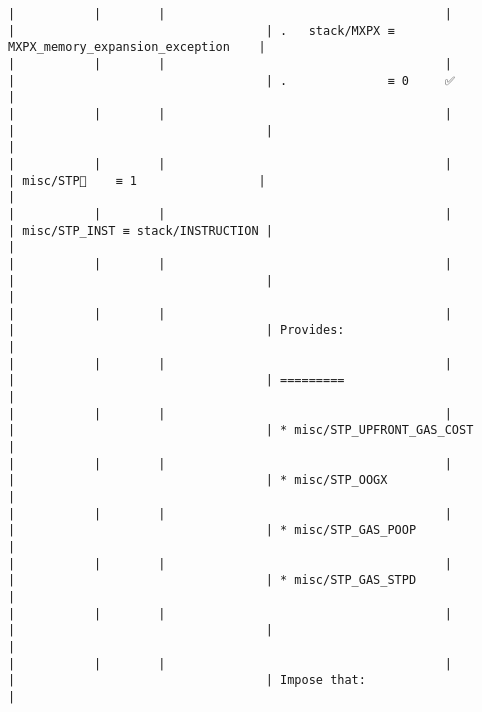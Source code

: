 \documentclass[varwidth=\maxdimen,margin=0.5cm,multi={verbatim}]{standalone}
\begin{document}
\begin{verbatim}
|           |        |                                       |                                 |                                   | .   stack/MXPX ≡ MXPX_memory_expansion_exception    |
|           |        |                                       |                                 |                                   | .              ≡ 0     ✅                           |
|           |        |                                       |                                 |                                   |                                                     |
|           |        |                                       |                                 | misc/STP🚩    ≡ 1                 |                                                     |
|           |        |                                       |                                 | misc/STP_INST ≡ stack/INSTRUCTION |                                                     |
|           |        |                                       |                                 |                                   |                                                     |
|           |        |                                       |                                 |                                   | Provides:                                           |
|           |        |                                       |                                 |                                   | =========                                           |
|           |        |                                       |                                 |                                   | * misc/STP_UPFRONT_GAS_COST                         |
|           |        |                                       |                                 |                                   | * misc/STP_OOGX                                     |
|           |        |                                       |                                 |                                   | * misc/STP_GAS_POOP                                 |
|           |        |                                       |                                 |                                   | * misc/STP_GAS_STPD                                 |
|           |        |                                       |                                 |                                   |                                                     |
|           |        |                                       |                                 |                                   | Impose that:                                        |

\end{verbatim}
\end{document}
